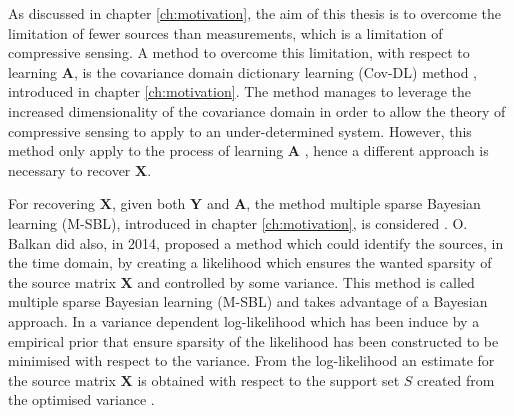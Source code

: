 As discussed in chapter \ref{ch:motivation}, the aim of this thesis is to overcome the limitation of fewer sources than measurements, which is a limitation of compressive sensing. 
A method to overcome this limitation, with respect to learning $\mathbf{A}$, is the covariance domain dictionary learning (Cov-DL) method \cite{Balkan2015}, introduced in chapter \ref{ch:motivation}. 
The method manages to leverage the increased dimensionality of the covariance domain in order to allow the theory of compressive sensing to apply to an under-determined system. 
However, this method only apply to the process of learning $\mathbf{A}$ , hence a different approach is necessary to recover $\mathbf{X}$.

For recovering $\mathbf{X}$, given both $\mathbf{Y}$ and $\mathbf{A}$, the method multiple sparse Bayesian learning (M-SBL), introduced in chapter \ref{ch:motivation}, is considered .
O. Balkan \cite{Balkan2014} did also, in 2014, proposed a method which could identify the sources, in the time domain, by creating a likelihood which ensures the wanted sparsity of the source matrix $\mathbf{X}$ and controlled by some variance. This method is called multiple sparse Bayesian learning (M-SBL) and takes advantage of a Bayesian approach. 
In \cite{Balkan2014} a variance dependent log-likelihood which has been induce  by a empirical prior that ensure sparsity of the likelihood has been constructed to be minimised with respect to the variance. 
From the log-likelihood an estimate for the source matrix $\mathbf{X}$ is obtained with respect to the support set $S$ created from the optimised variance  .






